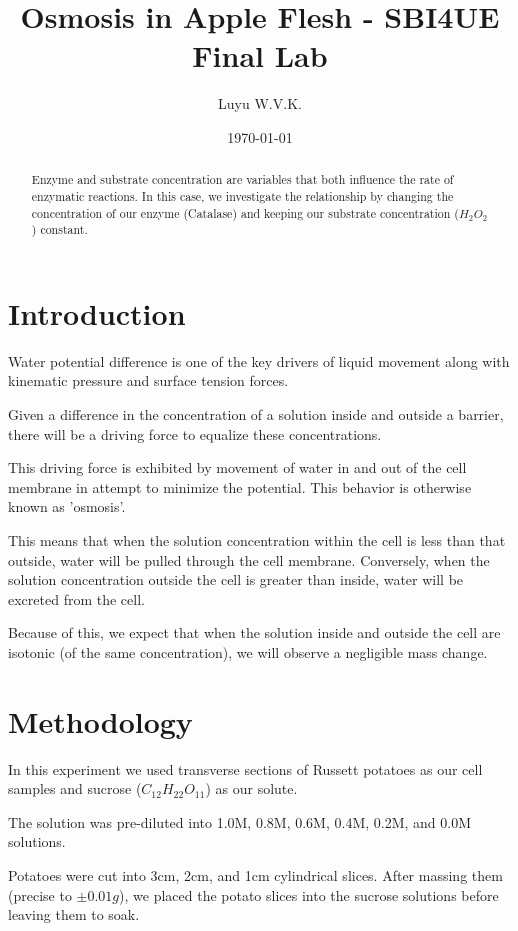 \documentclass[prl,twocolumn,amsmath,amssymb,superscriptaddress]{revtex4-2}
\begin{document}
\title{Osmosis in Apple Flesh - SBI4UE Final Lab}
\author{Luyu W.V.K.}
\date{\today}

\begin{abstract}
    Enzyme and substrate concentration are variables that both influence the rate of enzymatic reactions. In this case, we investigate the relationship by changing the concentration of our enzyme (Catalase) and keeping our substrate concentration ($H_{2}O_2$) constant.
\end{abstract}
\maketitle

\section{Introduction}
Water potential difference is one of the key drivers of liquid movement along with kinematic pressure and surface tension forces.

Given a difference in the concentration of a solution inside and outside a barrier, there will be a driving force to equalize these concentrations.

This driving force is exhibited by movement of water in and out of the cell membrane in attempt to minimize the potential. This behavior is otherwise known as 'osmosis'.

This means that when the solution concentration within the cell is less than that outside, water will be pulled through the cell membrane. Conversely, when the solution concentration outside the cell is greater than inside, water will be excreted from the cell.

Because of this, we expect that when the solution inside and outside the cell are isotonic (of the same concentration), we will observe a negligible mass change.

\section{Methodology}
In this experiment we used transverse sections of Russett potatoes as our cell samples and sucrose ($C_{12}H_{22}O_{11}$) as our solute.

The solution was pre-diluted into 1.0M, 0.8M, 0.6M, 0.4M, 0.2M, and 0.0M solutions.

Potatoes were cut into 3cm, 2cm, and 1cm cylindrical slices. After massing them (precise to $\pm 0.01g$), we placed the potato slices into the sucrose solutions before leaving them to soak.
\end{document}
